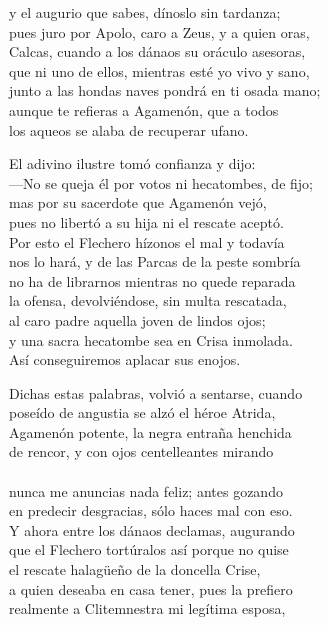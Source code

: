 y el augurio que sabes, dínoslo sin tardanza;\\
pues juro por Apolo, caro a Zeus, y a quien oras,\\
Calcas, cuando a los dánaos su oráculo asesoras,\\
que ni uno de ellos, mientras esté yo vivo y sano,\\
junto a las hondas naves pondrá en ti osada mano;\\
aunque te refieras a Agamenón, que a todos\\
los aqueos se alaba de recuperar ufano.\par
El adivino ilustre tomó confianza y dijo:\\
---No se queja él por votos ni hecatombes, de fijo;\\
mas por su sacerdote que Agamenón vejó,\\
pues no libertó a su hija ni el rescate aceptó.\\
Por esto el Flechero hízonos el mal y todavía\\
nos lo hará, y de las Parcas de la peste sombría\\
no ha de librarnos mientras no quede reparada\\
la ofensa, devolviéndose, sin multa rescatada,\\
al caro padre aquella joven de lindos ojos;\\
y una sacra hecatombe sea en Crisa inmolada.\\
Así conseguiremos aplacar sus enojos.\par
Dichas estas palabras, volvió a sentarse, cuando\\
poseído de angustia se alzó el héroe Atrida,\\
Agamenón potente, la negra entraña henchida\\
de rencor, y con ojos centelleantes mirando\\
\\
nunca me anuncias nada feliz; antes gozando\\
en predecir desgracias, sólo haces mal con eso.\\
Y ahora entre los dánaos declamas, augurando\\
que el Flechero tortúralos así porque no quise\\
el rescate halagüeño de la doncella Crise,\\
a quien deseaba en casa tener, pues la prefiero\\
realmente a Clitemnestra mi legítima esposa,\\
